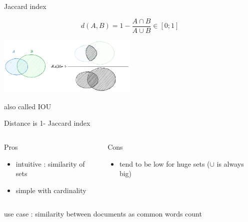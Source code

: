 \documentclass{beamer}
\begin{document}
\begin{frame}{Jaccard index}

$$d(A,B)= 1-\frac{A \cap B}{A \cup B} \in [0;1]$$

\begin{center}
\includegraphics[width=0.5\textwidth,keepaspectratio]{img/jaccard.png}
\end{center}


\begin{scriptsize}
also called \alert{IOU}

Distance is 1- Jaccard index



\begin{columns}[T,onlytextwidth]
\begin{block}{Pros}
\begin{itemize}
  \item intuitive : similarity of sets
  \item simple with cardinality
\end{itemize}
\end{block}
\begin{block}{Cons}
\begin{spacing}{0.9}
\begin{itemize}
  \item tend to be low for huge sets ($\cup$ is always big)
\end{itemize}
\end{spacing}
\end{block}
\end{columns}
\end{scriptsize}


use case : similarity between documents as common words count

\end{frame}
\end{document}
